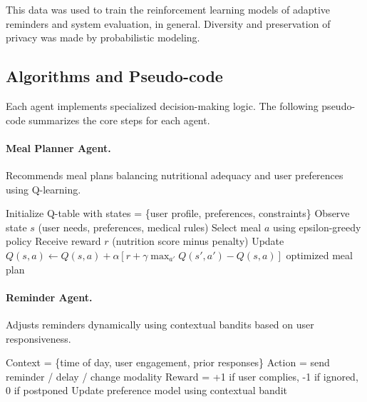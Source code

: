 \documentclass[pdflatex,sn-mathphys-num]{sn-jnl}
\begin{document}
This data was used to train the reinforcement learning models of adaptive reminders and system evaluation, in general. Diversity and preservation of privacy was made by probabilistic modeling.



\subsection{Algorithms and Pseudo-code}

Each agent implements specialized decision-making logic. The following pseudo-code summarizes the core steps for each agent.

\paragraph{Meal Planner Agent.}  
Recommends meal plans balancing nutritional adequacy and user preferences using Q-learning.

\begin{algorithm}
	\caption{Meal Planner Agent}
	\begin{algorithmic}[1]
		\State Initialize Q-table with states = \{user profile, preferences, constraints\}
		\State Observe state $s$ (user needs, preferences, medical rules)
		\State Select meal $a$ using epsilon-greedy policy
		\State Receive reward $r$ (nutrition score minus penalty)
		\State Update $Q(s,a) \gets Q(s,a) + \alpha [r + \gamma \max_{a'} Q(s',a') - Q(s,a)]$
		\EndFor
		\State \Return optimized meal plan
	\end{algorithmic}
\end{algorithm}

\paragraph{Reminder Agent.}  
Adjusts reminders dynamically using contextual bandits based on user responsiveness.

\begin{algorithm}
	\caption{Reminder Agent}
	\begin{algorithmic}[1]
		\State Context = \{time of day, user engagement, prior responses\}
		\State Action = send reminder / delay / change modality
		\State Reward = +1 if user complies, -1 if ignored, 0 if postponed
		\State Update preference model using contextual bandit
	\end{algorithmic}
\end{algorithm}
\end{document}
